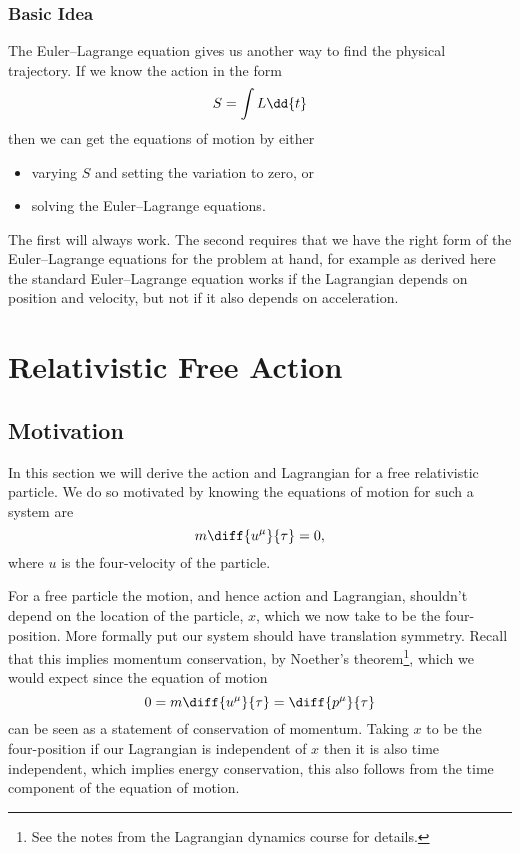 \subsection{Basic Idea}
The Euler--Lagrange equation gives us another way to find the physical trajectory.
If we know the action in the form
\begin{equation}
    S = \int \lagrangian \dd{t}
\end{equation}
then we can get the equations of motion by either
\begin{itemize}
    \item varying \(S\) and setting the variation to zero, or
    \item solving the Euler--Lagrange equations.
\end{itemize}
The first will always work.
The second requires that we have the right form of the Euler--Lagrange equations for the problem at hand, for example as derived here the standard Euler--Lagrange equation works if the Lagrangian depends on position and velocity, but not if it also depends on acceleration.

\chapter{Relativistic Free Action}
\section{Motivation}
In this section we will derive the action and Lagrangian for a free relativistic particle.
We do so motivated by knowing the equations of motion for such a system are
\begin{equation}
    m\diff{u^\mu}{\tau} = 0,
\end{equation}
where \(u\) is the four-velocity of the particle.

For a free particle the motion, and hence action and Lagrangian, shouldn't depend on the location of the particle, \(x\), which we now take to be the four-position.
More formally put our system should have translation symmetry.
Recall that this implies momentum conservation, by Noether's theorem\footnote{See the notes from the Lagrangian dynamics course for details.}, which we would expect since the equation of motion
\begin{equation}
    0 = m\diff{u^\mu}{\tau} = \diff{p^\mu}{\tau}
\end{equation}
can be seen as a statement of conservation of momentum.
Taking \(x\) to be the four-position if our Lagrangian is independent of \(x\) then it is also time independent, which implies energy conservation, this also follows from the time component of the equation of motion.

